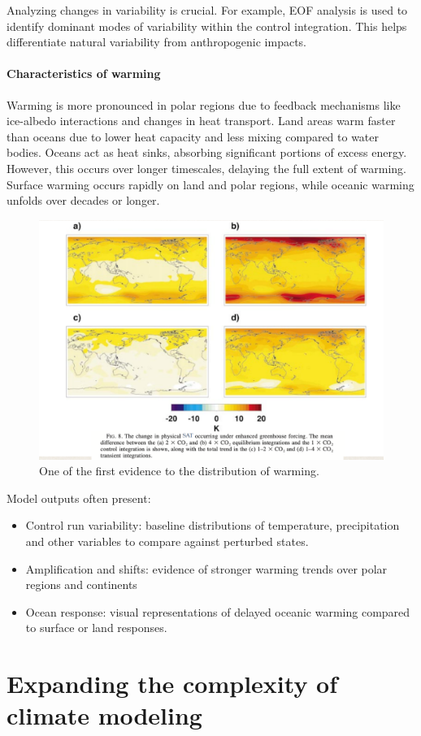Analyzing changes in variability is crucial. For example, EOF analysis is used to identify dominant modes of variability within the control integration. This helps differentiate natural variability from anthropogenic impacts.
\paragraph{Characteristics of warming}
Warming is more pronounced in polar regions due to feedback mechanisms like ice-albedo interactions and changes in heat transport. Land areas warm faster than oceans due to lower heat capacity and less mixing compared to water bodies. Oceans act as heat sinks, absorbing significant portions of excess energy. However, this occurs over longer timescales, delaying the full extent of warming. Surface warming occurs rapidly on land and polar regions, while oceanic warming unfolds over decades or longer.

\begin{figure}[htpb]
    \centering
    \includegraphics[width=0.5\linewidth]{uploads/imagewarming.png}
    \caption{One of the first evidence to the distribution of warming.}
    \label{fig:warming}
\end{figure}

Model outputs often present: 
\begin{itemize}
    \item Control run variability: baseline distributions of temperature, precipitation and other variables to compare against perturbed states. 
    \item Amplification and shifts: evidence of stronger warming trends over polar regions and continents 
    \item Ocean response: visual representations of delayed oceanic warming compared to surface or land responses.
\end{itemize}
\section{Expanding the complexity of climate modeling}
